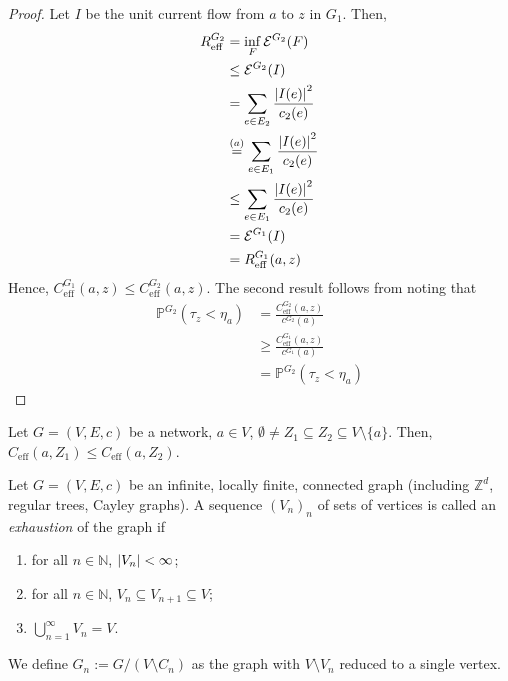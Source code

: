 \begin{proof}
    Let \(I\) be the unit current flow from \(a\) to \(z\) in \(G_1\). Then,
    \begin{align*}
      R_{\mathrm{eff}}^{G_2}&= \inf_{\mathclap{F}} \mathcal{E}^{G_2}(F) \\
                            & \leq \mathcal{E}^{G_2}(I) \\
                            & = \sum_{e\in E_2} \frac{\abs{I(e)} ^2}{c_2(e)} \\
                            & \overset{(a)}{=}\sum_{e \in E_1} \frac{\abs{I(e)} ^2}{c_2(e)} \\
                            & \leq \sum_{e \in E_1} \frac{\abs{I(e)} ^2}{c_2(e)} \\
                            & = \mathcal{E}^{G_1}(I) \\
                            & = R_{\mathrm{eff}}^{G_1}(a,z)
    \end{align*}
Hence, \(C_{\mathrm{eff}}^{G_1}(a,z) \leq C_{\mathrm{eff}}^{G_2}(a,z)\). The second result follows from noting that
\begin{align*}
  \mathbb{P}^{G_2}(\tau_z <\eta_a) &= \frac{C_{\mathrm{eff}}^{G_2}(a,z)}{c^{G_2}(a)} \\
                                   &\geq \frac{C_{\mathrm{eff}}^{G_1}(a,z)}{c^{G_1}(a)} \\
                                   &= \mathbb{P}^{G_2}(\tau_z < \eta_a)
\end{align*}

\end{proof}


\begin{corl}
    Let \(G=(V,E,c) \) be a network, \(a\in V\), \(\emptyset \neq Z_1 \subseteq Z_2 \subseteq V \setminus \{a \} \). Then, \(C_{\mathrm{eff}}(a,Z_1) \leq C_{\mathrm{eff}}(a,Z_2)\).
\end{corl}



\begin{defn}[Exhaustion]
    Let \(G=(V,E,c)\) be an infinite, locally finite, connected graph (including \(\mathbb{Z}^d\), regular trees, Cayley graphs). A sequence \((V_n)_n \) of sets of vertices is called an \emph{exhaustion} of the graph if 
    \begin{enumerate}[1)]
      \item for all \(n \in \mathbb{N}\), \(\abs{V_n} < \infty \);
      \item for all \(n \in  \mathbb{N}\), \(V_n \subseteq V_{n+1} \subseteq V\);
      \item \( \bigcup_{n=1}^{\infty} V_n = V\).
    \end{enumerate}
    We define \(G_n := G / (V \setminus C_n)\) as the graph with \(V \setminus V_n \) reduced to a single vertex.
\end{defn}


